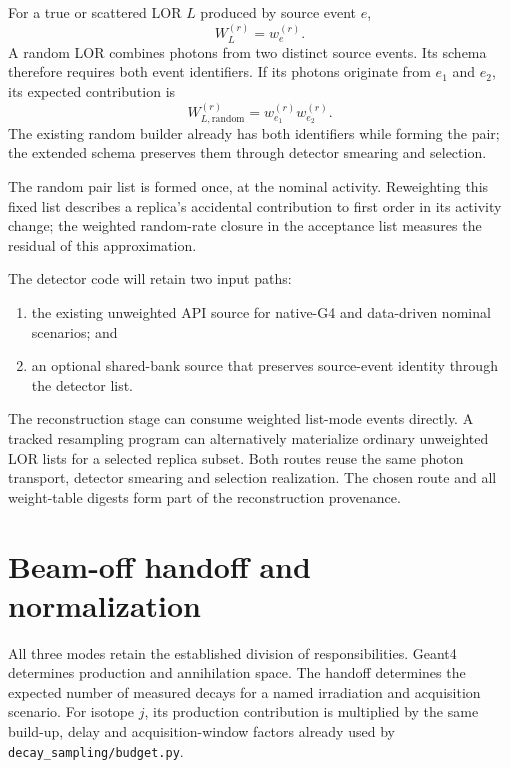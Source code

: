 \documentclass[11pt]{article}
\newcommand{\file}[1]{\texttt{#1}}
\begin{document}
For a true or scattered LOR $L$ produced by source event $e$,
\begin{equation}
 W_L^{(r)}=w_e^{(r)}.
 \label{eq:true-lor-weight}
\end{equation}
A random LOR combines photons from two distinct source events.  Its schema
therefore requires both event identifiers.  If its photons originate from
$e_1$ and $e_2$, its expected contribution is
\begin{equation}
 W_{L,\mathrm{random}}^{(r)}=
 w_{e_1}^{(r)}w_{e_2}^{(r)}.
 \label{eq:random-lor-weight}
\end{equation}
The existing random builder already has both identifiers while forming the
pair; the extended schema preserves them through detector smearing and
selection.

The random pair list is formed once, at the nominal activity.  Reweighting
this fixed list describes a replica's accidental contribution to first order
in its activity change; the weighted random-rate closure in the acceptance
list measures the residual of this approximation.

The detector code will retain two input paths:
\begin{enumerate}[nosep]
  \item the existing unweighted API source for native-G4 and data-driven
        nominal scenarios; and
  \item an optional shared-bank source that preserves source-event identity
        through the detector list.
\end{enumerate}

The reconstruction stage can consume weighted list-mode events directly.  A
tracked resampling program can alternatively materialize ordinary unweighted
LOR lists for a selected replica subset.  Both routes reuse the same photon
transport, detector smearing and selection realization.  The chosen route and
all weight-table digests form part of the reconstruction provenance.

\section{Beam-off handoff and normalization}

All three modes retain the established division of responsibilities.  Geant4
determines production and annihilation space.  The handoff determines the
expected number of measured decays for a named irradiation and acquisition
scenario.  For isotope $j$, its production contribution is multiplied by the
same build-up, delay and acquisition-window factors already used by
\file{decay\_sampling/budget.py}.
\end{document}
